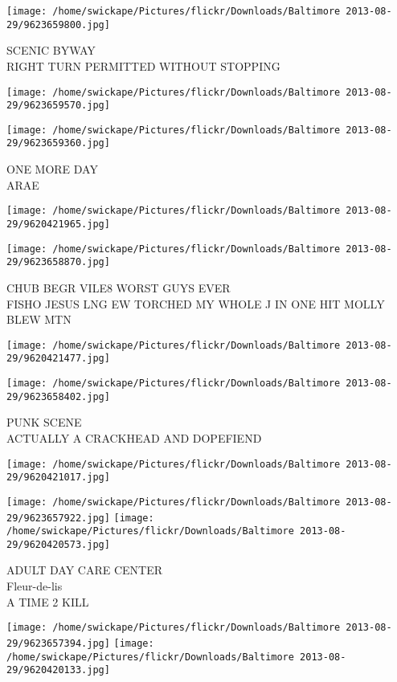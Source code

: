 \documentclass[10pt,letterpaper]{article}
\begin{document}
\vspace{0.25in}
\texttt{[image: /home/swickape/Pictures/flickr/Downloads/Baltimore 2013-08-29/9623659800.jpg]}

SCENIC BYWAY\\
RIGHT TURN PERMITTED WITHOUT STOPPING
\pagebreak

\texttt{[image: /home/swickape/Pictures/flickr/Downloads/Baltimore 2013-08-29/9623659570.jpg]}

\vspace{0.25in}
\texttt{[image: /home/swickape/Pictures/flickr/Downloads/Baltimore 2013-08-29/9623659360.jpg]}

ONE MORE DAY\\
ARAE
\pagebreak

\texttt{[image: /home/swickape/Pictures/flickr/Downloads/Baltimore 2013-08-29/9620421965.jpg]}

\vspace{0.25in}
\texttt{[image: /home/swickape/Pictures/flickr/Downloads/Baltimore 2013-08-29/9623658870.jpg]}

CHUB BEGR VILE8 WORST GUYS EVER\\
FISHO JESUS LNG EW TORCHED MY WHOLE J IN ONE HIT MOLLY BLEW MTN
\pagebreak

\texttt{[image: /home/swickape/Pictures/flickr/Downloads/Baltimore 2013-08-29/9620421477.jpg]}

\vspace{0.25in}
\texttt{[image: /home/swickape/Pictures/flickr/Downloads/Baltimore 2013-08-29/9623658402.jpg]}

PUNK SCENE\\
ACTUALLY A CRACKHEAD AND DOPEFIEND
\pagebreak

\texttt{[image: /home/swickape/Pictures/flickr/Downloads/Baltimore 2013-08-29/9620421017.jpg]}

\vspace{0.25in}
\texttt{[image: /home/swickape/Pictures/flickr/Downloads/Baltimore 2013-08-29/9623657922.jpg]}
\texttt{[image: /home/swickape/Pictures/flickr/Downloads/Baltimore 2013-08-29/9620420573.jpg]}

ADULT DAY CARE CENTER\\
Fleur{-}de{-}lis\\
A TIME 2 KILL
\pagebreak

\texttt{[image: /home/swickape/Pictures/flickr/Downloads/Baltimore 2013-08-29/9623657394.jpg]}
\texttt{[image: /home/swickape/Pictures/flickr/Downloads/Baltimore 2013-08-29/9620420133.jpg]}
\end{document}
